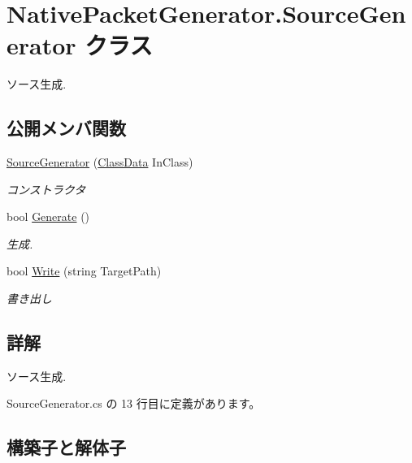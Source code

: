 \hypertarget{classNativePacketGenerator_1_1SourceGenerator}{}\section{Native\+Packet\+Generator.\+Source\+Generator クラス}
\label{classNativePacketGenerator_1_1SourceGenerator}


ソース生成.  


\subsection*{公開メンバ関数}
\begin{DoxyCompactItemize}
\item 
\mbox{\hyperlink{classNativePacketGenerator_1_1SourceGenerator_a8f2584e74b30663d797fe331683ab8ae}{Source\+Generator}} (\mbox{\hyperlink{classNativePacketGenerator_1_1ClassData}{Class\+Data}} In\+Class)
\begin{DoxyCompactList}\small\item\em コンストラクタ \end{DoxyCompactList}\item 
bool \mbox{\hyperlink{classNativePacketGenerator_1_1SourceGenerator_aeaea7a3e074b34f368319ec0c7497b0d}{Generate}} ()
\begin{DoxyCompactList}\small\item\em 生成. \end{DoxyCompactList}\item 
bool \mbox{\hyperlink{classNativePacketGenerator_1_1SourceGenerator_aa5979e5d36fb06fcc2466b088f230dfd}{Write}} (string Target\+Path)
\begin{DoxyCompactList}\small\item\em 書き出し \end{DoxyCompactList}\end{DoxyCompactItemize}


\subsection{詳解}
ソース生成. 



 Source\+Generator.\+cs の 13 行目に定義があります。



\subsection{構築子と解体子}
\mbox{\label{classNativePacketGenerator_1_1SourceGenerator_a8f2584e74b30663d797fe331683ab8ae}} 
